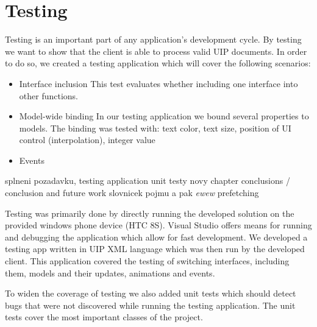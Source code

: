 \chapter{Testing}
Testing is an important part of any application's development cycle. By testing we want to show that the client is able to process valid UIP documents. In order to do so, we created a testing application which will cover the following scenarios:\\


\begin{itemize}
  \item Interface inclusion
  This test evaluates whether including one interface into other functions.
  \item Model-wide binding
  In our testing application we bound several properties to models. The binding was tested with: text color, text size, position of UI control (interpolation), integer value
  \item Events
\end{itemize}

splneni pozadavku,
testing application
unit testy
novy chapter conclusions / conclusion and future work
slovnicek pojmu a pak \emph{ewew}
prefetching

Testing was primarily done by directly running the developed solution on the provided windows phone device (HTC 8S). Visual Studio offers means for running and debugging the application which allow for fast development. 
We developed a testing app written in UIP XML language which was then run by the developed client. This application covered the testing of switching interfaces, including them, models and their updates, animations and events.

To widen the coverage of testing we also added unit tests which should detect bugs that were not discovered while running the testing application. The unit tests cover the most important classes of the project.
